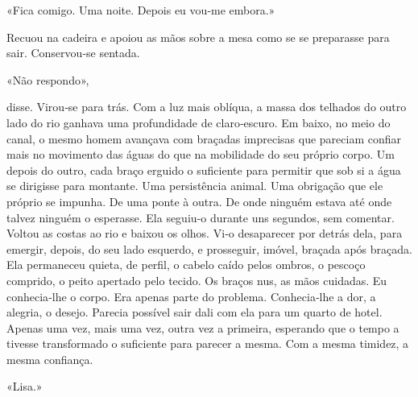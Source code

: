 «Fica comigo. Uma noite. Depois eu vou­‑me embora.»

Recuou na cadeira e apoiou as mãos sobre a mesa como se se preparasse
para sair. Conservou­‑se sentada.

«Não respondo»,

disse. Virou­‑se para trás. Com a luz mais oblíqua, a massa dos telhados
do outro lado do rio ganhava uma profundidade de claro­‑escuro. Em
baixo, no meio do canal, o mesmo homem avançava com braçadas imprecisas
que pareciam confiar mais no movimento das águas do que na mobilidade do
seu próprio corpo. Um depois do outro, cada braço erguido o suficiente
para permitir que sob si a água se dirigisse para montante. Uma
persistência animal. Uma obrigação que ele próprio se impunha. De uma
ponte à outra. De onde ninguém estava até onde talvez ninguém o
esperasse. Ela seguiu­‑o durante uns segundos, sem comentar. Voltou as
costas ao rio e baixou os olhos. Vi­‑o desaparecer por detrás dela, para
emergir, depois, do seu lado esquerdo, e prosseguir, imóvel, braçada
após braçada. Ela permaneceu quieta, de perfil, o cabelo caído pelos
ombros, o pescoço comprido, o peito apertado pelo tecido. Os braços nus,
as mãos cuidadas. Eu conhecia­‑lhe o corpo. Era apenas parte do
problema. Conhecia­‑lhe a dor, a alegria, o desejo. Parecia possível
sair dali com ela para um quarto de hotel. Apenas uma vez, mais uma vez,
outra vez a primeira, esperando que o tempo a tivesse transformado o
suficiente para parecer a mesma. Com a mesma timidez, a mesma confiança.

«Lisa.»

